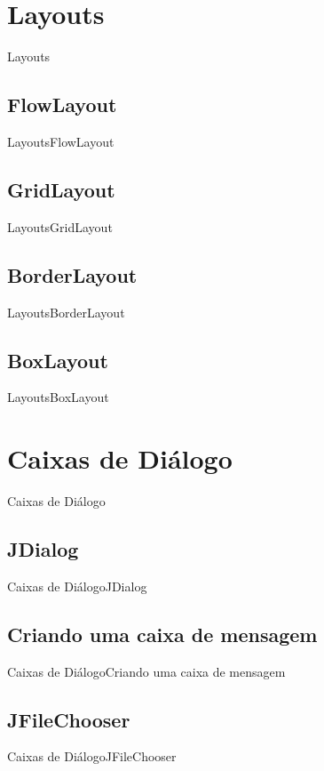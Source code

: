 \documentclass[10pt]{beamer}
\begin{document}
\section{Layouts}
\begin{frame}{Layouts}{}
\end{frame}{}
\subsection{FlowLayout}
\begin{frame}{Layouts}{FlowLayout}
\end{frame}{}
\subsection{GridLayout}
\begin{frame}{Layouts}{GridLayout}
\end{frame}{}
\subsection{BorderLayout}
\begin{frame}{Layouts}{BorderLayout}
\end{frame}{}
\subsection{BoxLayout}
\begin{frame}{Layouts}{BoxLayout}
\end{frame}{}
\section{Caixas de Diálogo}
\begin{frame}{Caixas de Diálogo}{}
\end{frame}{}
\subsection{JDialog}
\begin{frame}{Caixas de Diálogo}{JDialog}
\end{frame}{}
\subsection{Criando uma caixa de mensagem}
\begin{frame}{Caixas de Diálogo}{Criando uma caixa de mensagem}
\end{frame}{}
\subsection{JFileChooser}
\begin{frame}{Caixas de Diálogo}{JFileChooser}
\end{frame}{}
\end{document}

